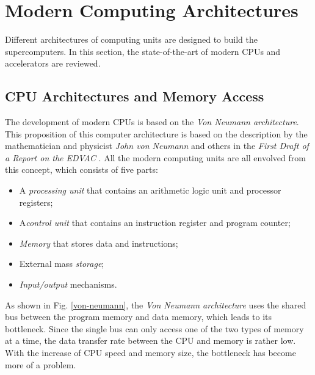 \section{Modern Computing Architectures}\label{Modern Computing Architectures}

Different architectures of computing units are designed to build the supercomputers. In this section, the state-of-the-art of modern CPUs and accelerators are reviewed.

\subsection{CPU Architectures and Memory Access}

The development of modern CPUs is based on the \textit{Von Neumann architecture}. This proposition of this computer architecture is based on the description by the mathematician and physicist \textit{John von Neumann} and others in the \textit{First Draft of a Report on the EDVAC} \cite{von1945first}. All the modern computing units are all envolved from this concept, which consists of five parts:

\begin{itemize}
	\item A \textit{processing unit} that contains an arithmetic logic unit and processor registers;
	\item A\textit{control unit} that contains an instruction register and program counter;
	\item \textit{Memory} that stores data and instructions;
	\item External mass \textit{storage};
	\item \textit{Input/output} mechanisms.
\end{itemize}

As shown in Fig. \ref{von-neumann}, the \textit{Von Neumann architecture} uses the shared bus between the program memory and data memory, which leads to its bottleneck. Since the single bus can only access one of the two types of memory at a time, the data transfer rate between the CPU and memory is rather low. With the increase of CPU speed and memory size,  the bottleneck has become more of a problem.

